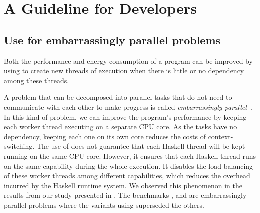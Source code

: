 \chapter{A Guideline for Developers}
\lipsum[1-2]


\section{Use \forkOn for embarrassingly parallel problems}
 Both the performance and energy consumption of a program can be improved by using \forkOn to create new threads of execution when there is little or no dependency among these threads.
\newline

 A problem that can be decomposed into parallel tasks that do not need to communicate with each other to make progress is called \emph{embarrassingly parallel}~\cite{herlihy:2012}. In this kind of problem, we can improve the program's performance by keeping each worker thread executing on a separate CPU core. As the tasks have no dependency, keeping each one on its own core reduces the costs of context-switching. The use of \forkOn does not guarantee that each Haskell thread will be kept running on the same CPU core. However, it ensures that each Haskell thread runs on the same capability during the whole execution. It disables the load balancing of these worker threads among different capabilities, which reduces the overhead incurred by the Haskell runtime system. We observed this phenomenon in the results from our study presented in . The benchmarks \mandelbrot, \regex and \spectral are embarrassingly parallel problems where the variants using \forkOn superseded the others.

